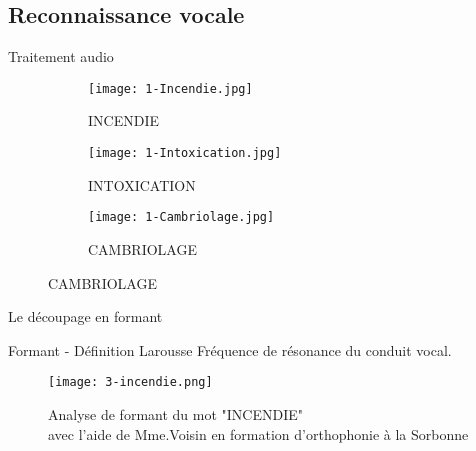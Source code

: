 \subsection{Reconnaissance vocale}

\begin{frame}{Traitement audio}
	\begin{figure}
		\begin{subfigure}[]{0.32\textwidth}
			\texttt{[image: 1-Incendie.jpg]}
			\caption{INCENDIE}
		\end{subfigure}
		\begin{subfigure}[]{0.32\textwidth}
			\texttt{[image: 1-Intoxication.jpg]}
			\caption{INTOXICATION}
		\end{subfigure}
		\begin{subfigure}[]{0.32\textwidth}
			\texttt{[image: 1-Cambriolage.jpg]}
			\caption{CAMBRIOLAGE}
		\end{subfigure}
	\end{figure}
\end{frame}



\begin{frame}{Le découpage en formant}
	\begin{block}{Formant - Définition Larousse}
		Fréquence de résonance du conduit vocal. \\
	\end{block}
	\begin{figure}
		\begin{center}
			\centering
			\texttt{[image: 3-incendie.png]}
			\caption{Analyse de formant du mot "INCENDIE" \\avec l'aide de Mme.Voisin en formation d'orthophonie à la Sorbonne}
		\end{center}
	\end{figure}
\end{frame}
